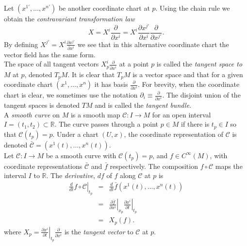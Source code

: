 
Let $(x^{1'},\dots,x^{n'})$ be another coordinate chart at $p$. Using the chain
rule we obtain the \textit{contravariant transformation law}
\begin{equation} X= X^i \frac{\partial}{\partial x^i}= X^i \frac{\partial
x^{j'}}{\partial x^i}\frac{\partial}{\partial x^{j'}} .\label{eq:contratp}
\end{equation}
By defining $X^{j'}=X^i \frac{\partial x^{j'}}{\partial x^i}$ we see that in
this alternative coordinate chart the vector field has the same form. \\

The space of all tangent vectors $X^i_p  \frac{\partial}{\partial x^i}$ at a
point $p$ is called the \textit{tangent space to $M$} at $p$, denoted $T_p M$.
It is clear that $T_p M$ is a vector space and that for a given coordinate chart
$(x^1,\dots,x^n)$ it has basis $\frac{\partial}{\partial x^i}$. For brevity,
when the coordinate chart is clear, we sometimes use the notation
$\partial_i\equiv\frac{\partial}{\partial x^i}$. The disjoint union of the
tangent spaces is denoted $TM$ and is called the \textit{tangent bundle}.\\

A \textit{smooth curve} on $M$ is a smooth map $\mathcal{C}:I \rightarrow M$ for
an open interval $I=(t_1,t_2)\subset\mathbb{R}$. The curve passes through a
point $p\in M$ if there is $t_p \in I$ so that $\mathcal{C}(t_p)= p$. Under a
chart $(U,x)$, the coordinate representation of $\mathcal{C}$ is denoted
$\bar{\mathcal{C}}=(x^1(t),\dots,x^n(t))$.\\

Let $\mathcal{C}:I\rightarrow M$ be a smooth curve with $\mathcal{C}(t_p)=p$,
and $f\in C^{\infty}(M)$, with coordinate representations $\bar{\mathcal{C}}$
and $\bar{f}$ respectively. The composition $f\circ \mathcal{C}$ maps the
interval $I$ to $\mathbb{R}$. The \textit{derivative}, $df$ of $f$ along
$\mathcal{C}$ at $p$ is 
\begin{eqnarray}
\left. \frac{d}{dt}f\circ \mathcal{C}\right|_{t_p}&=&
\frac{d}{dt}\bar{f}(x^1(t),\dots,x^n(t))\nonumber \\
  &=& \left.\frac{\partial \bar{f}}{\partial x^i}\right|_{x_p}
\left.\frac{\partial x^i}{\partial t}\right|_{t_p} \nonumber \\
  &=& X_p(f). \label{eqn:devcurve}
\end{eqnarray}
where $X_p=\left.\frac{\partial x^i}{\partial
t}\right|_{t_p}\frac{\partial}{\partial x^i}$ is the \textit{tangent vector} to
$\mathcal{C}$ at $p$.

